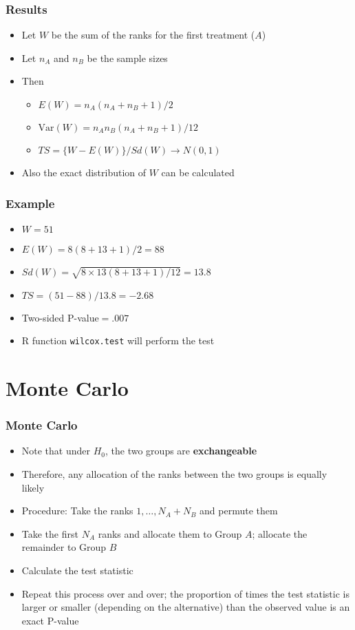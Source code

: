\documentclass[aspectratio=169]{beamer}
\newcommand{\Var}{\mathrm{Var}}
\begin{document}
\begin{frame}\frametitle{Results} 
\begin{itemize}
\item  Let $W$ be the sum of the ranks for the first treatment ($A$)
\item Let $n_A$ and $n_B$ be the sample sizes 
\item Then
\begin{itemize}
\item $E(W) = n_A ( n_A + n_B + 1)/ 2$
\item $\Var(W) = n_A n_B (n_A + n_B + 1) / 12$
\item $TS = \{W - E(W)\}/Sd(W) \rightarrow N(0,1)$
\end{itemize}
\item Also the exact distribution of $W$ can be calculated
\end{itemize}
\end{frame}

\begin{frame}\frametitle{Example}
\begin{itemize}
\item $W = 51$
\item $E(W) = 8 (8 + 13 + 1) / 2 = 88$
\item $Sd(W) = \sqrt{8 \times 13 (8 + 13 + 1) / 12} = 13.8$
\item $TS = (51 - 88) / 13.8 = -2.68$
\item Two-sided P-value$ = .007$
\item R function \texttt{wilcox.test} will perform the test
\end{itemize}
\end{frame}

\section{Monte Carlo}
\begin{frame}\frametitle{Monte Carlo}
\begin{itemize}
\item Note that under $H_0$, the two groups are {\bf exchangeable}
\item Therefore, any allocation of the ranks between the two groups is
  equally likely
\item Procedure: Take the ranks $1,\ldots,N_A+N_B$ and permute them
\item Take the first $N_A$ ranks and allocate them to Group $A$;
  allocate the remainder to Group $B$
\item Calculate the test statistic
\item Repeat this process over and over; the proportion of times the
  test statistic is larger or smaller (depending on the alternative) than
  the observed value is an exact P-value
\end{itemize}
\end{frame}
\end{document}
